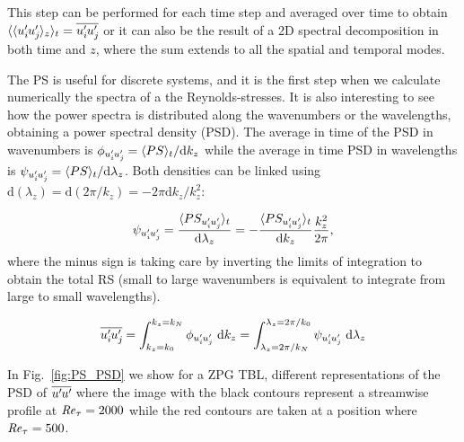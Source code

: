 This step can be performed for each time step and averaged over time to obtain $\langle\langle u_i^{\prime}\mkern-1.2mu u_j^{\prime}\mkern-1.2mu \rangle_{z}\rangle_{t} = \overline{u_i^{\prime}\mkern-1.2mu u_j^{\prime}\mkern-1.2mu}$ or it can also be the result of a 2D spectral decomposition in both time and $z$, where the sum extends to all the spatial and temporal modes.

The PS is useful for discrete systems, and it is the first step when we calculate numerically the spectra of a the Reynolds-stresses. It is also interesting to see how the power spectra is distributed along the wavenumbers or the wavelengths, obtaining a power spectral density (PSD).
The average in time of the PSD in wavenumbers is $\phi_{u_i^{\prime}\mkern-1.2mu u_j^{\prime}\mkern-1.2mu}=\langle PS \rangle_t/\mathrm{d} k_z$ while the average in time PSD in wavelengths is $\psi_{u_i^{\prime}\mkern-1.2mu u_j^{\prime}\mkern-1.2mu}= \langle PS \rangle_t/\mathrm{d} \lambda_z$. Both densities can be linked using $\mathrm{d}(\lambda_z) = \mathrm{d}(2\pi/k_z) = -2\pi\mathrm{d}k_z/k_z^2$:

\begin{equation}
    \psi_{u_i^{\prime}\mkern-1.2mu u_j^{\prime}\mkern-1.2mu} = 
    \frac{ \langle PS_{u_i^{\prime}\mkern-1.2mu u_j^{\prime}\mkern-1.2mu} \rangle_t}{\mathrm{d} \lambda_z} =
    -\frac{ \langle PS_{u_i^{\prime}\mkern-1.2mu u_j^{\prime}\mkern-1.2mu} \rangle_t}{\mathrm{d} k_z} \frac{k_z^2}{2\pi},
\end{equation}
where the minus sign is taking care by inverting the limits of integration to obtain the total RS (small to large wavenumbers is equivalent to integrate from large to small wavelengths).

\begin{equation}
\label{eq:sum_ps}
    \overline{u_i^{\prime}\mkern-1.2mu u_j^{\prime}\mkern-1.2mu} = 
    \int_{k_z=k_0}^{k_z=k_{N}}   \phi_{u_i^{\prime}\mkern-1.2mu u_j^{\prime}\mkern-1.2mu}  ~ \mathrm{d} k_z =
    \int^{\lambda_z = 2\pi/k_0}_{\lambda_z = 2\pi/k_{N}}  \psi_{u_i^{\prime}\mkern-1.2mu u_j^{\prime}\mkern-1.2mu}  ~ \mathrm{d} \lambda_z
\end{equation}

In Fig.~\ref{fig:PS_PSD} we show for a ZPG TBL, different representations of the PSD of $\overline{u^{\prime}\mkern-1.2mu u^{\prime}\mkern-1.2mu}$ where the image with the black contours represent a streamwise profile at $\mbox{\textit{Re}}_{\tau}=2000$ while the red contours are taken at a position where $\mbox{\textit{Re}}_{\tau}=500$.

